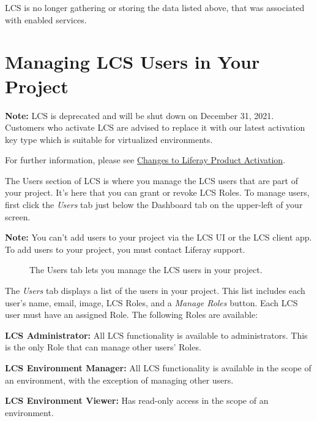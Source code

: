 LCS is no longer gathering or storing the data listed above, that was
associated with enabled services.

\chapter{Managing LCS Users in Your
Project}\label{managing-lcs-users-in-your-project}

\noindent\hrulefill

\textbf{Note:} LCS is deprecated and will be shut down on December 31,
2021. Customers who activate LCS are advised to replace it with our
latest activation key type which is suitable for virtualized
environments.

For further information, please see
\href{https://help.liferay.com/hc/en-us/articles/4402347960845-Changes-to-Liferay-Product-Activation}{Changes
to Liferay Product Activation}.

\noindent\hrulefill

The Users section of LCS is where you manage the LCS users that are part
of your project. It's here that you can grant or revoke LCS Roles. To
manage users, first click the \emph{Users} tab just below the Dashboard
tab on the upper-left of your screen.

\noindent\hrulefill

\textbf{Note:} You can't add users to your project via the LCS UI or the
LCS client app. To add users to your project, you must contact Liferay
support.

\noindent\hrulefill

\begin{figure}
\centering
{}
\caption{The Users tab lets you manage the LCS users in your project.}
\end{figure}

The \emph{Users} tab displays a list of the users in your project. This
list includes each user's name, email, image, LCS Roles, and a
\emph{Manage Roles} button. Each LCS user must have an assigned Role.
The following Roles are available:

\textbf{LCS Administrator:} All LCS functionality is available to
administrators. This is the only Role that can manage other users'
Roles.

\textbf{LCS Environment Manager:} All LCS functionality is available in
the scope of an environment, with the exception of managing other users.

\textbf{LCS Environment Viewer:} Has read-only access in the scope of an
environment.

